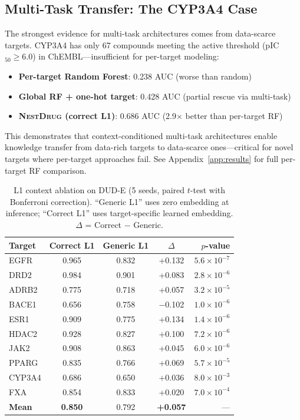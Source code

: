 \documentclass[runningheads]{llncs}
\newcommand{\methodname}{\textsc{NestDrug}}
\begin{document}
\subsection{Multi-Task Transfer: The CYP3A4 Case}

The strongest evidence for multi-task architectures comes from data-scarce targets. CYP3A4 has only 67 compounds meeting the active threshold (pIC$_{50} \geq 6.0$) in ChEMBL---insufficient for per-target modeling:
\begin{itemize}[noitemsep,topsep=0pt]
    \item \textbf{Per-target Random Forest}: 0.238 AUC (worse than random)
    \item \textbf{Global RF + one-hot target}: 0.428 AUC (partial rescue via multi-task)
    \item \textbf{\methodname{} (correct L1)}: 0.686 AUC (2.9$\times$ better than per-target RF)
\end{itemize}
This demonstrates that context-conditioned multi-task architectures enable knowledge transfer from data-rich targets to data-scarce ones---critical for novel targets where per-target approaches fail. See Appendix~\ref{app:results} for full per-target RF comparison.

\begin{table}[t]
\caption{L1 context ablation on DUD-E (5 seeds, paired $t$-test with Bonferroni correction). ``Generic L1'' uses zero embedding at inference; ``Correct L1'' uses target-specific learned embedding. $\Delta$ = Correct $-$ Generic.}
\label{tab:l1_ablation}
\centering
\small
\begin{tabular}{@{}lcccr@{}}
\toprule
Target & Correct L1 & Generic L1 & $\Delta$ & $p$-value \\
\midrule
EGFR & 0.965 & 0.832 & +0.132 & $5.6 \times 10^{-7}$ \\
DRD2 & 0.984 & 0.901 & +0.083 & $2.8 \times 10^{-6}$ \\
ADRB2 & 0.775 & 0.718 & +0.057 & $3.2 \times 10^{-5}$ \\
BACE1 & 0.656 & 0.758 & $-$0.102 & $1.0 \times 10^{-6}$ \\
ESR1 & 0.909 & 0.775 & +0.134 & $1.4 \times 10^{-6}$ \\
HDAC2 & 0.928 & 0.827 & +0.100 & $7.2 \times 10^{-6}$ \\
JAK2 & 0.908 & 0.863 & +0.045 & $6.0 \times 10^{-6}$ \\
PPARG & 0.835 & 0.766 & +0.069 & $5.7 \times 10^{-5}$ \\
CYP3A4 & 0.686 & 0.650 & +0.036 & $8.0 \times 10^{-3}$ \\
FXA & 0.854 & 0.833 & +0.020 & $7.0 \times 10^{-4}$ \\
\midrule
\textbf{Mean} & \textbf{0.850} & 0.792 & \textbf{+0.057} & --- \\
\bottomrule
\end{tabular}
\end{table}
\end{document}
